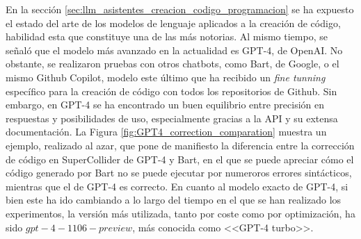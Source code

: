En la sección \ref{sec:llm_asistentes_creacion_codigo_programacion} se ha expuesto el estado del arte de los modelos de lenguaje aplicados a la creación de código, habilidad esta que constituye una de las más notorias. Al mismo tiempo, se señaló que el modelo más avanzado en la actualidad es GPT-4, de OpenAI. No obstante, se realizaron pruebas con otros chatbots, como Bart, de Google, o el mismo Github Copilot, modelo este último que ha recibido un \textit{fine tunning} específico para la creación de código con todos los repositorios de Github. Sin embargo, en GPT-4 se ha encontrado un buen equilibrio entre precisión en respuestas y posibilidades de uso, especialmente gracias a la API y su extensa documentación. La Figura \ref{fig:GPT4_correction_comparation} muestra un ejemplo, realizado al azar, que pone de manifiesto la diferencia entre la corrección de código en SuperCollider de GPT-4 y Bart, en el que se puede apreciar cómo el código generado por Bart no se puede ejecutar por numeroros errores sintácticos, mientras que el de GPT-4 es correcto. En cuanto al modelo exacto de GPT-4, si bien este ha ido cambiando a lo largo del tiempo en el que se han realizado los experimentos, la versión más utilizada, tanto por coste como por optimización, ha sido $gpt-4-1106-preview$, más conocida como <<GPT-4 turbo>>.



